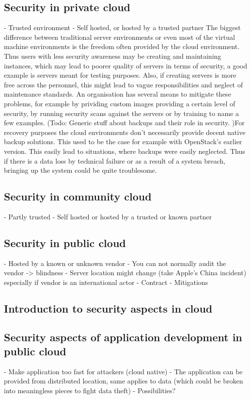 \documentclass{article}
\begin{document}
\subsection{Security in private cloud}
- Trusted environment
- Self hosted, or hosted by a trusted partner
The biggest difference between traditional server environments or even most of the virtual machine environments is the freedom often provided by the cloud environment. Thus users with less security awareness may be creating and maintaining instances, which may lead to poorer quality of servers in terms of security, a good example is servers meant for testing purposes. Also, if creating servers is more free across the personnel, this might lead to vague responsibilities and neglect of maintenance standards. An organisation has several means to mitigate these problems, for example by prividing custom images providing a certain level of security, by running security scans against the servers or by training to name a few examples.
(Todo: Generic stuff about backups and their role in security. )For recovery purposes the cloud environments don't necessarily provide decent native backup solutions. This used to be the case for example with OpenStack's earlier version. This easily lead to situations, where backups were easily neglected. Thus if there is a data loss by technical failure or as a result of a system breach, bringing up the system could be quite troublesome.
\subsection{Security in community cloud}
- Partly trusted
- Self hosted or hosted by a trusted or known partner
\subsection{Security in public cloud}
- Hosted by a known or unknown vendor
- You can not normally audit the vendor -> blindness
- Server location might change (take Apple's China incident) especially if vendor is an international actor
- Contract
- Mitigations
\subsection{Introduction to security aspects in cloud}
\subsection{Security aspects of application development in public cloud}
- Make application too fast for attackers (cloud native)
- The application can be provided from distributed location, same applies to data (which could be broken into meaningless pieces to fight data theft)
- Possibilities?
\end{document}
